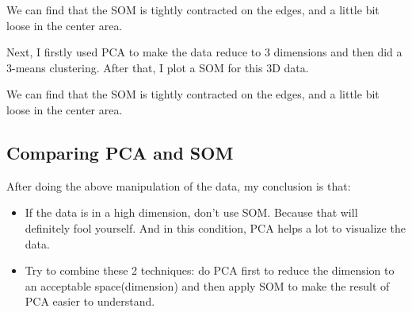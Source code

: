 \documentclass[titlepage,a4paper,12pt,thmsb]{report}
\begin{document}
\begin{center}
\begin{figure}[h]
{\par}
\end{figure}
{}
\end{center}

We can find that the SOM is tightly contracted on the edges, and a little bit loose in the center area.

\newpage

Next, I firstly used PCA to make the data reduce to 3 dimensions and then did a 3-means clustering. After that, I plot a SOM for this 3D data.

\begin{center}
\begin{figure}[h]
{\par}
\end{figure}
{}
\end{center}

\begin{center}
\begin{figure}[h]
{\par}
\end{figure}
{}
\end{center}

We can find that the SOM is tightly contracted on the edges, and a little bit loose in the center area.


\newpage

\subsection{Comparing PCA and SOM}

After doing the above manipulation of the data, my conclusion is that:

\begin{itemize}
\item{If the data is in a high dimension, don't use SOM. Because that will definitely fool yourself. And in this condition, PCA helps a lot to visualize the data.}
\item{Try to combine these 2 techniques: do PCA first to reduce the dimension to an acceptable space(dimension) and then apply SOM to make the result of PCA easier to understand.}
\end{itemize}
\end{document}
